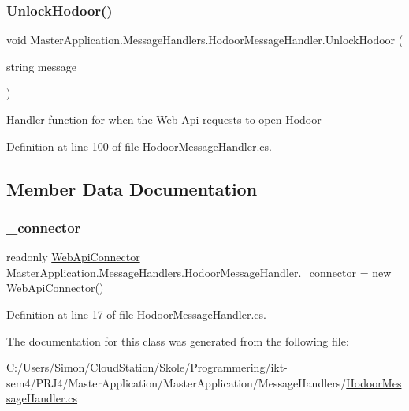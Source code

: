 \subsubsection{\texorpdfstring{Unlock\+Hodoor()}{UnlockHodoor()}}
{\footnotesize\ttfamily void Master\+Application.\+Message\+Handlers.\+Hodoor\+Message\+Handler.\+Unlock\+Hodoor (\begin{DoxyParamCaption}\item[{string}]{message }\end{DoxyParamCaption})\hspace{0.3cm}{\ttfamily [private]}}

Handler function for when the Web Api requests to open Hodoor 

Definition at line 100 of file Hodoor\+Message\+Handler.\+cs.



\subsection{Member Data Documentation}
\mbox{\label{class_master_application_1_1_message_handlers_1_1_hodoor_message_handler_abe79d0f7853328d474992ef055523f11}} 
\subsubsection{\texorpdfstring{\+\_\+connector}{\_connector}}
{\footnotesize\ttfamily readonly \mbox{\hyperlink{class_master_application_1_1_web_api_connector}{Web\+Api\+Connector}} Master\+Application.\+Message\+Handlers.\+Hodoor\+Message\+Handler.\+\_\+connector = new \mbox{\hyperlink{class_master_application_1_1_web_api_connector}{Web\+Api\+Connector}}()\hspace{0.3cm}{\ttfamily [private]}}



Definition at line 17 of file Hodoor\+Message\+Handler.\+cs.



The documentation for this class was generated from the following file\+:\begin{DoxyCompactItemize}
\item 
C\+:/\+Users/\+Simon/\+Cloud\+Station/\+Skole/\+Programmering/ikt-\/sem4/\+P\+R\+J4/\+Master\+Application/\+Master\+Application/\+Message\+Handlers/\mbox{\hyperlink{_hodoor_message_handler_8cs}{Hodoor\+Message\+Handler.\+cs}}\end{DoxyCompactItemize}
